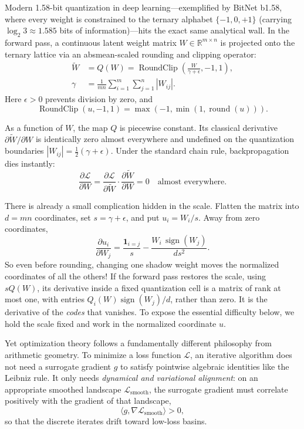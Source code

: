 Modern 1.58-bit quantization in deep learning—exemplified by BitNet b1.58, where every weight is constrained to the ternary alphabet $\{-1, 0, +1\}$ (carrying $\log_2 3 \approx 1.585$ bits of information)—hits the exact same analytical wall. In the forward pass, a continuous latent weight matrix $W \in \mathbb{R}^{m \times n}$ is projected onto the ternary lattice via an absmean-scaled rounding and clipping operator:
\begin{equation}
    \begin{aligned}
    \widetilde{W} &= Q(W) = \operatorname{RoundClip}\!\left(\frac{W}{\gamma + \epsilon}, -1, 1\right),\\
    \gamma &= \frac{1}{mn}\sum_{i=1}^m \sum_{j=1}^n |W_{ij}|.
    \end{aligned}
\end{equation}
Here $\epsilon>0$ prevents division by zero, and
\[
 \operatorname{RoundClip}(u,-1,1)
 =\max(-1,\min(1,\operatorname{round}(u))).
\]

As a function of $W$, the map $Q$ is piecewise constant. Its classical derivative $\partial \widetilde{W} / \partial W$ is identically zero almost everywhere and undefined on the quantization boundaries $|W_{ij}| = \tfrac{1}{2}(\gamma+\epsilon)$. Under the standard chain rule, backpropagation dies instantly:
\[
    \frac{\partial \mathcal{L}}{\partial W} = \frac{\partial \mathcal{L}}{\partial \widetilde{W}} \cdot \frac{\partial \widetilde{W}}{\partial W} = 0 \quad \text{almost everywhere.}
\]

There is already a small complication hidden in the scale. Flatten the matrix into $d=mn$ coordinates, set $s=\gamma+\epsilon$, and put $u_i=W_i/s$. Away from zero coordinates,
\[
 \frac{\partial u_i}{\partial W_j}
 =\frac{\mathbf 1_{i=j}}s
   -\frac{W_i\,\operatorname{sign}(W_j)}{ds^2}.
\]
So even before rounding, changing one shadow weight moves the normalized coordinates of all the others! If the forward pass restores the scale, using $sQ(W)$, its derivative inside a fixed quantization cell is a matrix of rank at most one, with entries $Q_i(W)\operatorname{sign}(W_j)/d$, rather than zero. It is the derivative of the \emph{codes} that vanishes. To expose the essential difficulty below, we hold the scale fixed and work in the normalized coordinate $u$.

Yet optimization theory follows a fundamentally different philosophy from arithmetic geometry. To minimize a loss function $\mathcal{L}$, an iterative algorithm does not need a surrogate gradient $g$ to satisfy pointwise algebraic identities like the Leibniz rule. It only needs \emph{dynamical and variational alignment}: on an appropriate smoothed landscape $\mathcal{L}_{\text{smooth}}$, the surrogate gradient must correlate positively with the gradient of that landscape,
\[
    \langle g, \nabla \mathcal{L}_{\text{smooth}} \rangle > 0,
\]
so that the discrete iterates drift toward low-loss basins.

